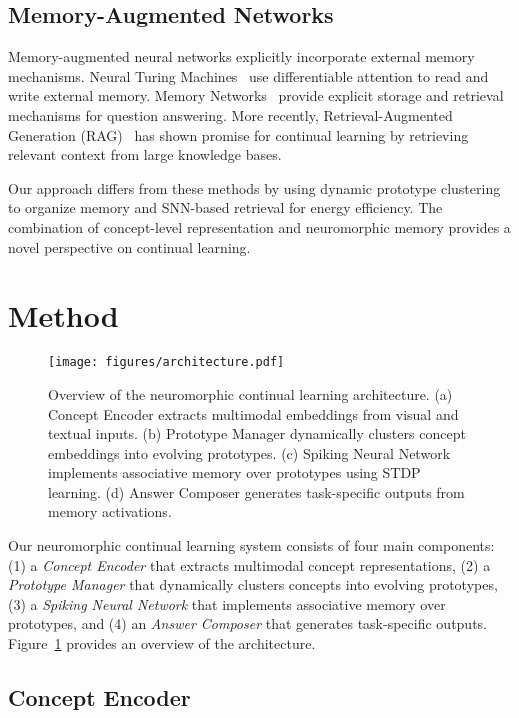 \documentclass{article}
\begin{document}
\subsection{Memory-Augmented Networks}

Memory-augmented neural networks explicitly incorporate external memory mechanisms. Neural Turing Machines~\cite{graves2014neural} use differentiable attention to read and write external memory. Memory Networks~\cite{weston2014memory} provide explicit storage and retrieval mechanisms for question answering. More recently, Retrieval-Augmented Generation (RAG)~\cite{lewis2020retrieval} has shown promise for continual learning by retrieving relevant context from large knowledge bases.

Our approach differs from these methods by using dynamic prototype clustering to organize memory and SNN-based retrieval for energy efficiency. The combination of concept-level representation and neuromorphic memory provides a novel perspective on continual learning.

\section{Method}
\label{sec:method}

\begin{figure}[t]
\centering
\texttt{[image: figures/architecture.pdf]}
\caption{Overview of the neuromorphic continual learning architecture. (a) Concept Encoder extracts multimodal embeddings from visual and textual inputs. (b) Prototype Manager dynamically clusters concept embeddings into evolving prototypes. (c) Spiking Neural Network implements associative memory over prototypes using STDP learning. (d) Answer Composer generates task-specific outputs from memory activations.}
\label{fig:architecture}
\end{figure}

Our neuromorphic continual learning system consists of four main components: (1) a \emph{Concept Encoder} that extracts multimodal concept representations, (2) a \emph{Prototype Manager} that dynamically clusters concepts into evolving prototypes, (3) a \emph{Spiking Neural Network} that implements associative memory over prototypes, and (4) an \emph{Answer Composer} that generates task-specific outputs. Figure~\ref{fig:architecture} provides an overview of the architecture.

\subsection{Concept Encoder}
\label{sec:concept_encoder}
\end{document}
